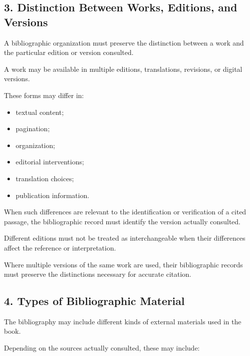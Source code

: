 
\subsection*{3. Distinction Between Works,
Editions, and Versions}

A bibliographic organization
must preserve the distinction
between a work and the particular
edition or version consulted.

A work may be available in
multiple editions, translations,
revisions, or digital versions.

These forms may differ in:

\begin{itemize}
    \item textual content;
    \item pagination;
    \item organization;
    \item editorial interventions;
    \item translation choices;
    \item publication information.
\end{itemize}

When such differences are
relevant to the identification
or verification of a cited passage,
the bibliographic record must
identify the version actually
consulted.

Different editions must not
be treated as interchangeable
when their differences affect
the reference or interpretation.

Where multiple versions of
the same work are used,
their bibliographic records
must preserve the distinctions
necessary for accurate citation.


\subsection*{4. Types of Bibliographic Material}

The bibliography may include
different kinds of external
materials used in the book.

Depending on the sources
actually consulted, these
may include:

